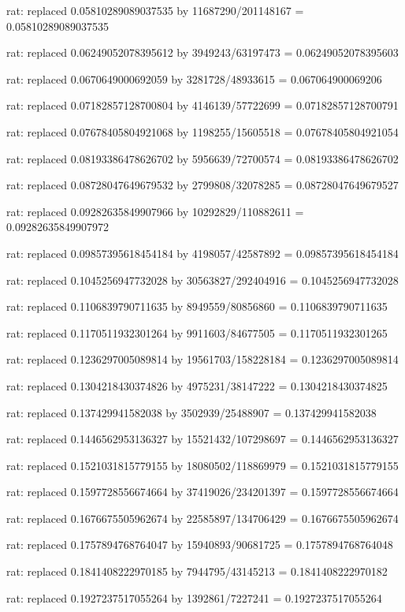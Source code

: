 \documentclass[a4paper,10pt]{article}
\begin{document}
\begin{eulernotebook}
\begin{eulercomment}
\begin{eulercomment}
\begin{eulercomment}
\begin{eulercomment}
\begin{eulercomment}
\begin{eulercomment}
\begin{eulercomment}
\begin{eulercomment}
\begin{eulercomment}
\begin{eulercomment}
\begin{eulercomment}
\begin{eulercomment}
\begin{eulercomment}
\begin{eulercomment}
\begin{eulercomment}
\begin{eulercomment}
\begin{euleroutput}
  rat: replaced 0.05810289089037535 by 11687290/201148167 = 0.05810289089037535
  
  rat: replaced 0.06249052078395612 by 3949243/63197473 = 0.06249052078395603
  
  rat: replaced 0.0670649000692059 by 3281728/48933615 = 0.067064900069206
  
  rat: replaced 0.07182857128700804 by 4146139/57722699 = 0.07182857128700791
  
  rat: replaced 0.07678405804921068 by 1198255/15605518 = 0.07678405804921054
  
  rat: replaced 0.08193386478626702 by 5956639/72700574 = 0.08193386478626702
  
  rat: replaced 0.08728047649679532 by 2799808/32078285 = 0.08728047649679527
  
  rat: replaced 0.09282635849907966 by 10292829/110882611 = 0.09282635849907972
  
  rat: replaced 0.09857395618454184 by 4198057/42587892 = 0.09857395618454184
  
  rat: replaced 0.1045256947732028 by 30563827/292404916 = 0.1045256947732028
  
  rat: replaced 0.1106839790711635 by 8949559/80856860 = 0.1106839790711635
  
  rat: replaced 0.1170511932301264 by 9911603/84677505 = 0.1170511932301265
  
  rat: replaced 0.1236297005089814 by 19561703/158228184 = 0.1236297005089814
  
  rat: replaced 0.1304218430374826 by 4975231/38147222 = 0.1304218430374825
  
  rat: replaced 0.137429941582038 by 3502939/25488907 = 0.137429941582038
  
  rat: replaced 0.1446562953136327 by 15521432/107298697 = 0.1446562953136327
  
  rat: replaced 0.1521031815779155 by 18080502/118869979 = 0.1521031815779155
  
  rat: replaced 0.1597728556674664 by 37419026/234201397 = 0.1597728556674664
  
  rat: replaced 0.1676675505962674 by 22585897/134706429 = 0.1676675505962674
  
  rat: replaced 0.1757894768764047 by 15940893/90681725 = 0.1757894768764048
  
  rat: replaced 0.1841408222970185 by 7944795/43145213 = 0.1841408222970182
  
  rat: replaced 0.1927237517055264 by 1392861/7227241 = 0.1927237517055264
  

\end{euleroutput}
\end{eulercomment}
\end{eulercomment}
\end{eulercomment}
\end{eulercomment}
\end{eulercomment}
\end{eulercomment}
\end{eulercomment}
\end{eulercomment}
\end{eulercomment}
\end{eulercomment}
\end{eulercomment}
\end{eulercomment}
\end{eulercomment}
\end{eulercomment}
\end{eulercomment}
\end{eulercomment}
\end{eulernotebook}
\end{document}

